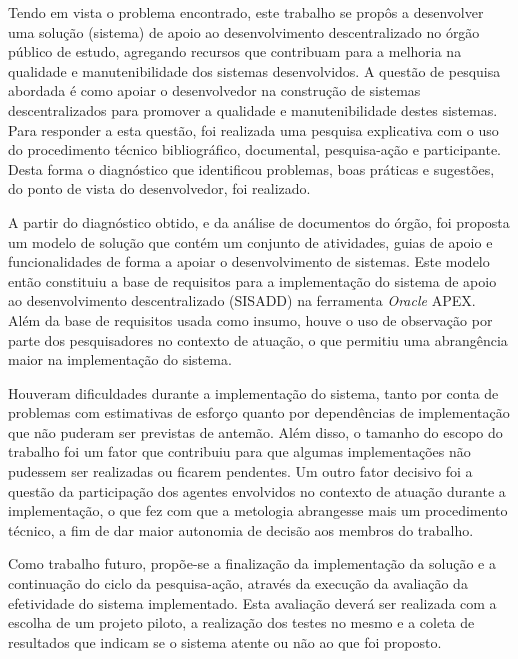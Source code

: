Tendo em vista o problema encontrado, este trabalho se propôs a desenvolver uma solução (sistema) de apoio ao desenvolvimento descentralizado no órgão público de estudo, agregando recursos que contribuam para a melhoria na qualidade e manutenibilidade dos sistemas desenvolvidos. A questão de pesquisa abordada é como apoiar o desenvolvedor na construção de sistemas descentralizados para promover a qualidade e manutenibilidade destes sistemas. Para responder a esta questão, foi realizada uma pesquisa explicativa com o uso do procedimento técnico bibliográfico, documental, pesquisa-ação e participante. Desta forma o diagnóstico que identificou problemas, boas práticas e sugestões, do ponto de vista do desenvolvedor, foi realizado.

A partir do diagnóstico obtido, e da análise de documentos do órgão, foi proposta um modelo de solução que contém um conjunto de atividades, guias de apoio e funcionalidades de forma a apoiar o desenvolvimento de sistemas. Este modelo então constituiu a base de requisitos para a implementação do sistema de apoio ao desenvolvimento descentralizado (SISADD) na ferramenta \textit{Oracle} APEX. Além da base de requisitos usada como insumo, houve o uso de observação por parte dos pesquisadores no contexto de atuação, o que permitiu uma abrangência maior na implementação do sistema.

Houveram dificuldades durante a implementação do sistema, tanto por conta de problemas com estimativas de esforço quanto por dependências de implementação que não puderam ser previstas de antemão. Além disso, o tamanho do escopo do trabalho foi um fator que contribuiu para que algumas implementações não pudessem ser realizadas ou ficarem pendentes. Um outro fator decisivo foi a questão da participação dos agentes envolvidos no contexto de atuação durante a implementação, o que fez com que a metologia abrangesse mais um procedimento técnico, a fim de dar maior autonomia de decisão aos membros do trabalho.

Como trabalho futuro, propõe-se a finalização da implementação da solução e a continuação do ciclo da pesquisa-ação, através da execução da avaliação da efetividade do sistema implementado. Esta avaliação deverá ser realizada com a escolha de um projeto piloto, a realização dos testes no mesmo e a coleta de resultados que indicam se o sistema atente ou não ao que foi proposto.